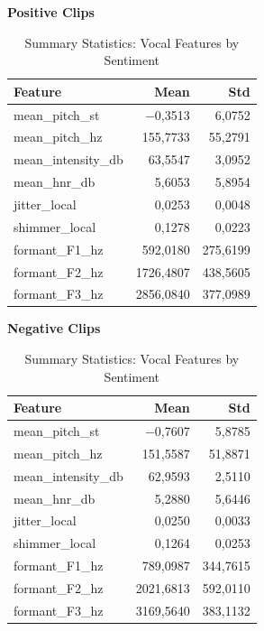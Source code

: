   \begin{table}[H]
    \centering
    \begin{subtable}{0.45\textwidth}
        \centering
        \caption*{\textbf{Positive Clips}}
        \begin{tabular}{lrr}
          \toprule
          \textbf{Feature}         & \textbf{Mean}    & \textbf{Std}    \\
          \midrule
            mean\_pitch\_st      & $-$0,3513 & 6,0752 \\
            mean\_pitch\_hz      & 155,7733 & 55,2791 \\
            mean\_intensity\_db  & 63,5547  & 3,0952 \\
            mean\_hnr\_db        & 5,6053   & 5,8954 \\
            jitter\_local        & 0,0253   & 0,0048 \\
            shimmer\_local       & 0,1278   & 0,0223 \\
            formant\_F1\_hz      & 592,0180 & 275,6199 \\
            formant\_F2\_hz      & 1726,4807 & 438,5605 \\
            formant\_F3\_hz      & 2856,0840 & 377,0989 \\
          \bottomrule
        \end{tabular}
    
    \end{subtable}\hfill
    \begin{subtable}{0.45\textwidth}
        \centering
        \caption*{\textbf{Negative Clips}}
        \begin{tabular}{lrr}
          \toprule
          \textbf{Feature}         & \textbf{Mean}    & \textbf{Std}    \\
          \midrule
            mean\_pitch\_st      & $-$0,7607 & 5,8785 \\
            mean\_pitch\_hz      & 151,5587 & 51,8871 \\
            mean\_intensity\_db  & 62,9593  & 2,5110 \\
            mean\_hnr\_db        & 5,2880   & 5,6446 \\
            jitter\_local        & 0,0250   & 0,0033 \\
            shimmer\_local       & 0,1264   & 0,0253 \\
            formant\_F1\_hz      & 789,0987 & 344,7615 \\
            formant\_F2\_hz      & 2021,6813 & 592,0110 \\
            formant\_F3\_hz      & 3169,5640 & 383,1132 \\
          \bottomrule
        \end{tabular}
    \end{subtable}
    \caption{Summary Statistics: Vocal Features by Sentiment}
    \label{tab:summary_vocal_features_by_sentiment}
  \end{table}
  
